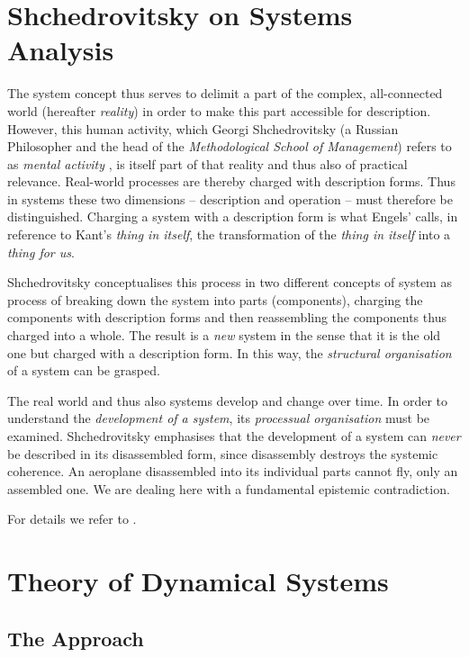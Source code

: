 \documentclass[11pt,a4paper]{article}
\begin{document}
\section{Shchedrovitsky on Systems Analysis}

The system concept thus serves to delimit a part of the complex, all-connected
world (hereafter \emph{reality}) in order to make this part accessible for
description. However, this human activity, which Georgi Shchedrovitsky (a
Russian Philosopher and the head of the \emph{Methodological School of
  Management}) refers to as \emph{mental activity} \cite[p. 47]{MSM}, is
itself part of that reality and thus also of practical relevance. Real-world
processes are thereby charged with description forms. Thus in systems these
two dimensions -- description and operation -- must therefore be
distinguished. Charging a system with a description form is what Engels'
calls, in reference to Kant's \emph{thing in itself}, the transformation of
the \emph{thing in itself} into a \emph{thing for us}.

Shchedrovitsky \cite[p. 80 ff.]{MSM} conceptualises this process in two
different concepts of system \cite[pp. 89 and 98]{MSM} as process of breaking
down the system into parts (components), charging the components with
description forms and then reassembling the components thus charged into a
whole.  The result is a \emph{new} system in the sense that it is the old one
but charged with a description form.  In this way, the \emph{structural
  organisation} of a system can be grasped.

The real world and thus also systems develop and change over time. In order to
understand the \emph{development of a system}, its \emph{processual
  organisation} must be examined.  Shchedrovitsky emphasises that the
development of a system can \emph{never} be described in its disassembled
form, since disassembly destroys the systemic coherence. An aeroplane
disassembled into its individual parts cannot fly, only an assembled one. We
are dealing here with a fundamental epistemic contradiction.

For details we refer to \cite{MSM}.

\section{Theory of Dynamical Systems}

\subsection{The Approach}
\end{document}
